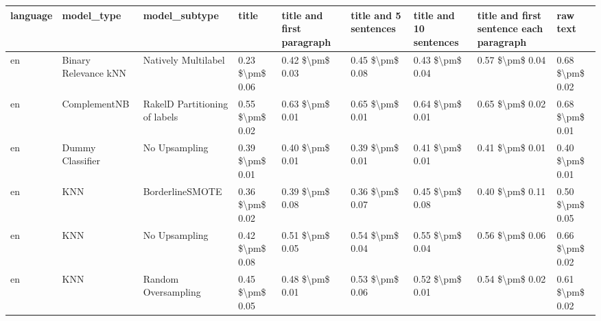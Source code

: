 \begin{tabular}{lllllllll}
\toprule
language &                      model\_type &                 model\_subtype &           title & title and first paragraph & title and 5 sentences & title and 10 sentences & title and first sentence each paragraph &            raw text \\
\midrule
      en &            Binary Relevance kNN &           Natively Multilabel & 0.23 \$\textbackslash pm\$ 0.06 &           0.42 \$\textbackslash pm\$ 0.03 &       0.45 \$\textbackslash pm\$ 0.08 &        0.43 \$\textbackslash pm\$ 0.04 &                         0.57 \$\textbackslash pm\$ 0.04 &     0.68 \$\textbackslash pm\$ 0.02 \\
      en &                    ComplementNB & RakelD Partitioning of labels & 0.55 \$\textbackslash pm\$ 0.02 &           0.63 \$\textbackslash pm\$ 0.01 &       0.65 \$\textbackslash pm\$ 0.01 &        0.64 \$\textbackslash pm\$ 0.01 &                         0.65 \$\textbackslash pm\$ 0.02 &     0.68 \$\textbackslash pm\$ 0.01 \\
      en &                Dummy Classifier &                 No Upsampling & 0.39 \$\textbackslash pm\$ 0.01 &           0.40 \$\textbackslash pm\$ 0.01 &       0.39 \$\textbackslash pm\$ 0.01 &        0.41 \$\textbackslash pm\$ 0.01 &                         0.41 \$\textbackslash pm\$ 0.01 &     0.40 \$\textbackslash pm\$ 0.01 \\
      en &                             KNN &               BorderlineSMOTE & 0.36 \$\textbackslash pm\$ 0.02 &           0.39 \$\textbackslash pm\$ 0.08 &       0.36 \$\textbackslash pm\$ 0.07 &        0.45 \$\textbackslash pm\$ 0.08 &                         0.40 \$\textbackslash pm\$ 0.11 &     0.50 \$\textbackslash pm\$ 0.05 \\
      en &                             KNN &                 No Upsampling & 0.42 \$\textbackslash pm\$ 0.08 &           0.51 \$\textbackslash pm\$ 0.05 &       0.54 \$\textbackslash pm\$ 0.04 &        0.55 \$\textbackslash pm\$ 0.04 &                         0.56 \$\textbackslash pm\$ 0.06 &     0.66 \$\textbackslash pm\$ 0.02 \\
      en &                             KNN &           Random Oversampling & 0.45 \$\textbackslash pm\$ 0.05 &           0.48 \$\textbackslash pm\$ 0.01 &       0.53 \$\textbackslash pm\$ 0.06 &        0.52 \$\textbackslash pm\$ 0.01 &                         0.54 \$\textbackslash pm\$ 0.02 &     0.61 \$\textbackslash pm\$ 0.02 \\

\end{tabular}

